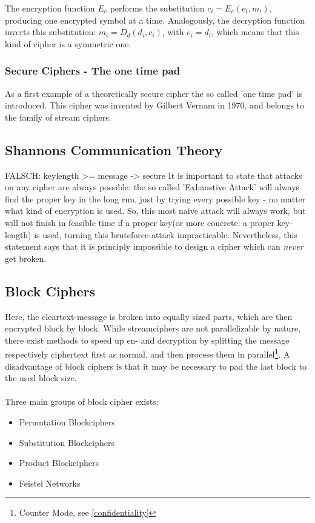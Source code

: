 The encryption function $E_e$ performs the substitution $c_i = E_e(e_i, m_i)$, producing one encrypted symbol at a time. Analogously,
the decryption function inverts this substitution: $m_i = D_d(d_i, c_i)$, with $e_i = d_i$, which means that this kind of cipher is a
symmetric one.

\subsubsection{Secure Ciphers - The one time pad}

As a first example of a theoretically secure cipher the so called 'one time pad' is introduced. This cipher was invented
by Gilbert Vernam in 1970, and belongs to the family of stream ciphers. 


\subsection{Shannons Communication Theory}

FALSCH: keylength >= message -> secure
It is important to state that attacks on any cipher are always possible: the so called
'Exhaustive Attack' will always find the proper key in the long run, just by trying every
possible key - no matter what kind of encryption is used. So, this most naive attack will always work, but
will not finish in feasible time if a proper key(or more concrete: a proper key-length) is used, turning this bruteforce-attack
impracticable. Nevertheless, this statement says that it is principly impossible to design
a cipher which can \textit{never} get broken.

\subsection{Block Ciphers}

Here, the cleartext-message is broken into equally sized parts, which are then encrypted block by block. While streamciphers are not parallelizable
by nature, there exist methods to speed up en- and decryption by splitting the message respectively ciphertext first as normal, and then process them in
parallel\footnote{Counter Mode, see \ref{confidentiality}}. A disadvantage of block ciphers is that it may be necessary to pad the last block to the used block size. 
\\
\\
Three main groups of block cipher exists:
\begin{itemize}
 \item Permutation Blockciphers
 \item Substitution Blockciphers
 \item Product Blockciphers
 \item Feistel Networks
\end{itemize}

